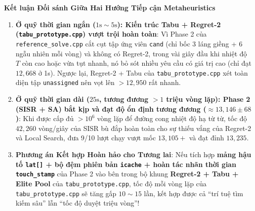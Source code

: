 \documentclass[11pt,a4paper]{article}
\theoremstyle{definition}
\newenvironment{keybox}[1]{%
    \par\medskip\noindent
    \begin{lrbox}{\calloutbox}%
    \begin{minipage}{\dimexpr\linewidth-2\fboxsep-2\fboxrule\relax}
    \textbf{\textcolor{primaryblue}{#1}}\par\smallskip
}{%
    \end{minipage}%
    \end{lrbox}%
    \fcolorbox{primaryblue}{secondaryblue}{\usebox{\calloutbox}}%
    \par\medskip
}
\begin{document}
\begin{keybox}{Kết luận Đối sánh Giữa Hai Hướng Tiếp cận Metaheuristics}
\begin{enumerate}[leftmargin=1.5em]
    \item \textbf{Ở quỹ thời gian ngắn ($1\text{s} \sim 5\text{s}$): Kiến trúc Tabu + Regret-2 (\texttt{tabu\_prototype.cpp}) vượt trội hoàn toàn}:
    Vì Phase 2 của \texttt{reference\_solve.cpp} cắt cụt tập ứng viên \texttt{cand} (chỉ bốc 3 láng giềng + 6 ngẫu nhiên mỗi vòng) và không có Regret-2, trong vài giây đầu khi nhiệt độ $T$ còn cao hoặc vừa tụt nhanh, nó bỏ sót nhiều yêu cầu có giá trị cao (chỉ đạt $12,668$ ở 1s). Ngược lại, Regret-2 + Tabu của \texttt{tabu\_prototype.cpp} xét toàn diện tập \texttt{unassigned} nên vọt lên $>12,950$ rất nhanh.
    \item \textbf{Ở quỹ thời gian dài ($25\text{s}$, tương đương $>1$ triệu vòng lặp): Phase 2 (SISR + SA) bắt kịp và đạt độ ổn định tương đương ($\approx 13,146 \pm 68$)}:
    Khi được cấp đủ $>10^6$ vòng lặp để đường cong nhiệt độ hạ từ từ, tốc độ $42,260$ vòng/giây của SISR bù đắp hoàn toàn cho sự thiếu vắng của Regret-2 và Local Search, đưa 9/10 lượt chạy vượt mốc $13,105+$ và đạt đỉnh $13,235$.
    \item \textbf{Phương án Kết hợp Hoàn hảo cho Tương lai}:
    Nếu tích hợp \textbf{mảng hậu tố \texttt{lat[]} + bộ đệm phiên bản \texttt{icache} + hoàn tác nhãn thời gian \texttt{touch\_stamp}} của Phase 2 vào bên trong bộ khung \textbf{Regret-2 + Tabu + Elite Pool} của \texttt{tabu\_prototype.cpp}, tốc độ mỗi vòng lặp của \texttt{tabu\_prototype.cpp} sẽ tăng gấp $10\sim 15$ lần, kết hợp được cả ``trí tuệ tìm kiếm sâu'' lẫn ``tốc độ duyệt triệu vòng''!
\end{enumerate}
\end{keybox}
\end{document}
